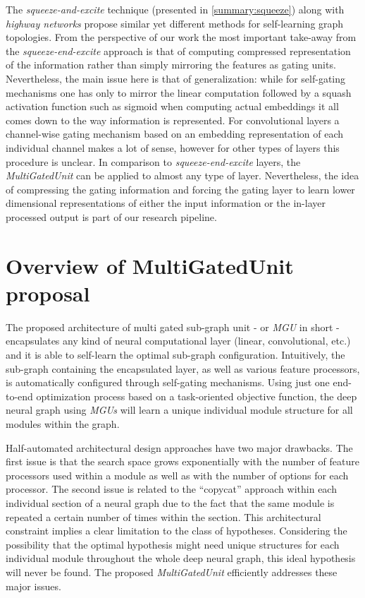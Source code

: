 \documentclass[conference]{IEEEtran}
\begin{document}
The \textit{squeeze-and-excite} technique (presented in \ref{summary:squeeze}) along with \textit{highway networks} propose similar yet different methods for self-learning graph topologies. From the perspective of our work the most important take-away from the \textit{squeeze-end-excite} approach is that of computing compressed representation of the information rather than simply mirroring the features as gating units. Nevertheless, the main issue here is that of generalization: while for self-gating mechanisms one has only to mirror the linear computation followed by a squash activation function such as sigmoid when computing actual embeddings it all comes down to the way information is represented. For convolutional layers a channel-wise gating mechanism based on an embedding representation of each individual channel makes a lot of sense, however for other types of layers this procedure is unclear. In comparison to \textit{squeeze-end-excite} layers, the \textit{MultiGatedUnit} can be applied to almost any type of layer. Nevertheless, the idea of compressing the gating information and forcing the gating layer to learn lower dimensional representations of either the input information or the in-layer processed output is part of our research pipeline.

\section{Overview of MultiGatedUnit proposal}
The proposed architecture of multi gated sub-graph unit - or \textit{MGU} in short - encapsulates any kind of neural computational layer (linear, convolutional, etc.) and it is able to self-learn the optimal sub-graph configuration. Intuitively, the sub-graph containing the encapsulated layer, as well as various feature processors, is automatically configured through self-gating mechanisms. Using just one end-to-end optimization process based on a task-oriented objective function, the deep neural graph using \textit{MGUs} will learn a unique individual module structure for all modules within the graph. 

Half-automated architectural design approaches have two major drawbacks. The first issue is that the search space grows exponentially with the number of feature processors used within a module as well as with the number of options for each processor. The second issue is related to the “copycat” approach within each individual section of a neural graph due to the fact that the same module is repeated a certain number of times within the section. This architectural constraint implies a clear limitation to the class of hypotheses. Considering the possibility that the optimal hypothesis might need unique structures for each individual module throughout the whole deep neural graph, this ideal hypothesis will never be found. The proposed \textit{MultiGatedUnit} efficiently addresses these major issues.
\end{document}
